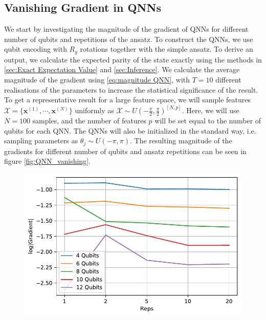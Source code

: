 \subsection{Vanishing Gradient in QNNs}\label{sec:Vanishing Gradient for QNNs}
We start by investigating the magnitude of the gradient of QNNs for different number of qubits and repetitions of the ansatz. To construct the QNNs, we use qubit encoding with $R_y$ rotations together with the simple ansatz. To derive an output, we calculate the expected parity of the state exactly using the methods in \autoref{sec:Exact Expectation Value} and \autoref{sec:Inference}. We calculate the average magnitude of the gradient using \autoref{eq:magnitude QNN}, with $T=10$ different realisations of the parameters to increase the statistical significance of the result. To get a representative result for a large feature space, we will sample features $\mathcal{X} = \{\boldsymbol{x}^{(1)}, \cdots, \boldsymbol{x}^{(N)}\}$ uniformly as $\mathcal{X} \sim U(-\frac{\pi}{2}, \frac{\pi}{2})^{[N,p]}$. Here, we will use $N=100$ samples, and the number of features $p$ will be set equal to the number of qubits for each QNN. The QNNs will also be initialized in the standard way, i.e. sampling parameters as $\theta_j \sim U(-\pi, \pi)$. The resulting magnitude of the gradients for different number of qubits and ansatz repetitions can be seen in figure \autoref{fig:QNN_vanishing}.

\begin{figure}[H]
    \centering
    \includegraphics[width=12cm]{latex/figures/vanishing_gradient_QNN.pdf}
    \caption{}
    \label{fig:QNN_vanishing}
\end{figure}

